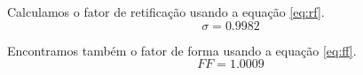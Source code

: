 \documentclass{report}
\begin{document}
Calculamos o fator de retificação usando a equação \ref{eq:rf}.
\begin{equation}
\sigma = 0.9982
\end{equation}

Encontramos também o fator de forma usando a equação \ref{eq:ff}.
\begin{equation}
FF = 1.0009
\end{equation}


\end{document}
